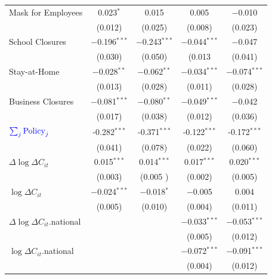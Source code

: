 \documentclass{beamer}
\def\pcolor{\color{blue}}
\def\icolor{\color{magenta}}
\begin{document}
\begin{frame}
\begin{table}[!htbp]
\begin{minipage}{\linewidth}
{\begin{tabular}{@{\extracolsep{1pt}}lcccc}
% 
% 
 
{\pcolor Mask for Employees}&0.023$^{*}$&0.015&0.005&$-$0.010 \\ 
  &(0.012)&(0.025)&(0.008)&(0.023) \\ 
{\pcolor School Closures} &$-$0.196$^{***}$ &$-$0.243$^{***}$ &$-$0.044$^{***}$ &$-$0.047 \\ 
  &(0.030)&(0.050)&(0.013&(0.041) \\ 
{\pcolor Stay-at-Home} &$-$0.028$^{**}$ &$-$0.062$^{**}$ &$-$0.034$^{***}$ &$-$0.074$^{***}$ \\ 
  &(0.013)&(0.028)&(0.011)&(0.028) \\ 
{\pcolor Business Closures} &$-$0.081$^{***}$ &$-$0.080$^{**}$ &$-$0.049$^{***}$ &$-$0.042 \\ 
  &(0.017)&(0.038)&(0.012)&(0.036) \\  \hline
  ${\pcolor \sum_j \mathrm{Policy}_j}$ &{\pcolor  -0.282$^{***}$}  &{\pcolor  -0.371$^{***}$ }&{\pcolor  -0.122$^{***}$}   & {\pcolor -0.172$^{***}$ }\\ 
    & (0.041) &   (0.078) & (0.022)  & (0.060) \\ \hline
   {\icolor $\Delta \log \Delta C_{it}$} &0.015$^{***}$ &0.014$^{***}$ &0.017$^{***}$ &0.020$^{***}$ \\ 
  &(0.003)&(0.005 )&(0.002)&(0.005) \\ 
  {\icolor  $\log \Delta C_{it}$} & {\icolor$-$0.024$^{***}$} & {\icolor$-$0.018$^{*}$} &$-$0.005 &0.004 \\ 
  &(0.005)&(0.010)&(0.004)&(0.011) \\ 
   {\icolor $\Delta \log \Delta C_{it}$.national}& &  &$-$0.033$^{***}$ &$-$0.053$^{***}$ \\ 
 & &  &(0.005)&(0.012) \\ 
 {\icolor   $\log \Delta C_{it}$.national}& &  &$-$0.072$^{***}$ &$-$0.091$^{***}$ \\ 
 & &  &(0.004)&(0.012) \\ \hline


\end{tabular}}
\end{minipage}
\end{table}
\end{frame}
\end{document}
